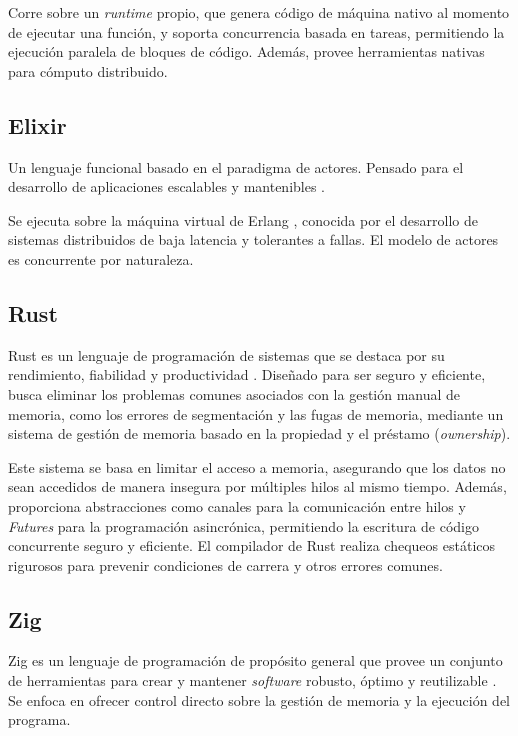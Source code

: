 \documentclass[11pt]{article}
\let\Oldsubsection\subsection
\renewcommand{\subsection}{\FloatBarrier\Oldsubsection}
\newcommand{\english}[1]{\textit{#1}}
\begin{document}
Corre sobre un \english{runtime} propio, que genera código de máquina nativo al momento de  ejecutar una función, y soporta concurrencia basada en tareas, permitiendo la ejecución paralela de bloques de código. Además, provee herramientas nativas para cómputo distribuido.

\subsection{Elixir}

Un lenguaje funcional basado en el paradigma de actores. Pensado para el desarrollo de aplicaciones escalables y mantenibles \cite{com:elixir}.

Se ejecuta sobre la máquina virtual de Erlang \cite{com:erlang}, conocida por el desarrollo de sistemas distribuidos de baja latencia y tolerantes a fallas. El modelo de actores es concurrente por naturaleza.

\subsection{Rust}

Rust es un lenguaje de programación de sistemas que se destaca por su rendimiento, fiabilidad y productividad \cite{com:rust}. Diseñado para ser seguro y eficiente, busca eliminar los problemas comunes asociados con la gestión manual de memoria, como los errores de segmentación y las fugas de memoria, mediante un sistema de gestión de memoria basado en la propiedad y el préstamo (\english{ownership}).

Este sistema se basa en limitar el acceso a memoria, asegurando que los datos no sean accedidos de manera insegura por múltiples hilos al mismo tiempo. Además, proporciona abstracciones como canales para la comunicación entre hilos y \english{Futures} para la programación asincrónica, permitiendo la escritura de código concurrente seguro y eficiente. El compilador de Rust realiza chequeos estáticos rigurosos para prevenir condiciones de carrera y otros errores comunes.

\subsection{Zig}

Zig es un lenguaje de programación de propósito general que provee un conjunto de herramientas para crear y mantener \english{software} robusto, óptimo y reutilizable \cite{com:zig}. Se enfoca en ofrecer control directo sobre la gestión de memoria y la ejecución del programa.
\end{document}
